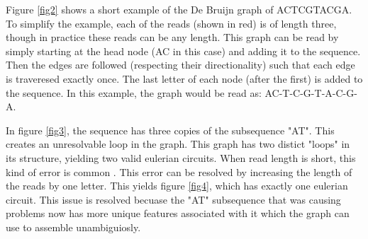 \documentclass[letterpaper, 10 pt]{ieeeconf}
\begin{document}
  Figure \ref{fig2} shows a short example of the De Bruijn graph of ACTCGTACGA.
  To simplify the example, each of the reads (shown in red) is of length three,
  though in practice these reads can be any length.  This graph can be read by
  simply starting at the head node (AC in this case) and adding it to the
  sequence.  Then the edges are followed (respecting their directionality) such
  that each edge is traveresed exactly once.  The last letter of each node
  (after the first) is added to the sequence.  In this example, the graph would
  be read as: AC-T-C-G-T-A-C-G-A.

  \break

  In figure \ref{fig3}, the sequence has three copies of the subsequence "AT".
  This creates an unresolvable loop in the graph.  This graph has two distict
  "loops" in its structure, yielding two valid eulerian circuits.  When read
  length is short, this kind of error is common \cite{langmead}.  This error can
  be resolved by increasing the length of the reads by one letter.  This yields
  figure \ref{fig4}, which has exactly one eulerian circuit.
  This issue is resolved becuase the "AT" subsequence that was causing problems
  now has more unique features associated with it which the graph can use to
  assemble unambiguiosly.
\end{document}
